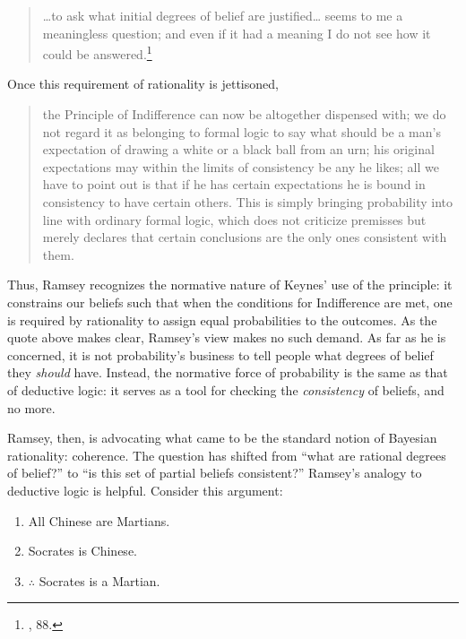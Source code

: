 \begin{quote}
\ldots{}to ask what initial degrees of belief are justified\ldots{}
seems to me a meaningless question; and even if it had a meaning I do
not see how it could be answered.\footnote{\cite{ramsey}, 88.}
\end{quote}

Once this requirement of rationality is jettisoned,

\begin{quote}
the Principle of Indifference can now be altogether dispensed with; we
do not regard it as belonging to formal logic to say what should be a
man's expectation of drawing a white or a black ball from an urn; his
original expectations may within the limits of consistency be any he
likes; all we have to point out is that if he has certain expectations
he is bound in consistency to have certain others. This is simply
bringing probability into line with ordinary formal logic, which does
not criticize premisses but merely declares that certain conclusions are
the only ones consistent with them.
\end{quote}

Thus, Ramsey recognizes the normative nature of Keynes' use of the
principle: it constrains our beliefs such that when the conditions for
Indifference are met, one is required by rationality to assign equal probabilities to the outcomes. As the quote above
makes clear, Ramsey's view makes no such demand. As far as he is
concerned, it is not probability's business to tell people what degrees
of belief they \emph{should} have. Instead, the normative force of
probability is the same as that of deductive logic: it serves as a tool
for checking the \emph{consistency} of  beliefs, and no more.

Ramsey, then, is advocating what came to be the standard notion of
Bayesian rationality: coherence. The question has shifted from ``what
are rational degrees of belief?'' to ``is this set of partial beliefs
consistent?'' Ramsey's analogy to deductive logic is helpful. Consider
this argument:

\begin{enumerate}
	\item All Chinese are Martians.
	\item  Socrates is Chinese.
	\item  \(\therefore\) Socrates is a Martian.
\end{enumerate}

